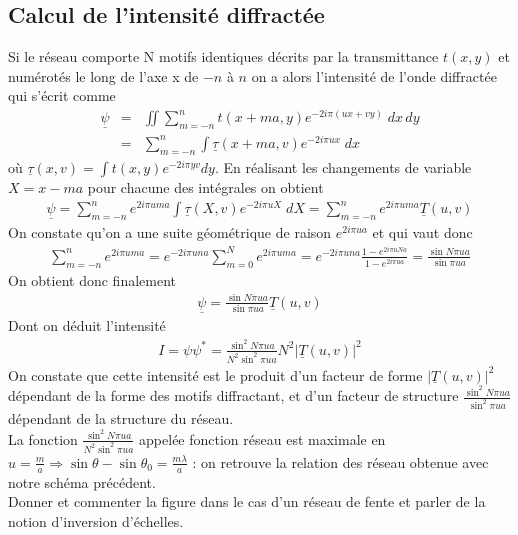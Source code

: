 \documentclass[12pt,prb,aps,epsf]{article}
\begin{document}
\subsection{Calcul de l'intensité diffractée}
Si le réseau comporte N motifs identiques décrits par la transmittance $t(x,y)$ et numérotés le long de l'axe x de $-n$ à $n$ on a alors l'intensité de l'onde diffractée qui s'écrit comme 
\begin{eqnarray}
\underline{\psi} &=& \iint \sum_{m= -n}^{n} t(x+ma, y) e^{-2i\pi(ux+vy)}\; dx\,dy\\
&=& \sum_{m= -n}^{n} \int \underline{\tau}(x+ma, v) e^{-2i\pi ux} \;dx
\end{eqnarray}
où $\underline{\tau}(x, v) = \int t(x,y) e^{-2i\pi yv} dy$. En réalisant les changements de variable $X = x - ma$ pour chacune des intégrales on obtient 
\begin{eqnarray}
\underline{\psi} = \sum_{m= -n}^{n} e^{2i\pi uma}\int \underline{\tau}(X, v) e^{-2i\pi uX} \;dX = \sum_{m= -n}^{n} e^{2i\pi uma} \underline{T}(u,v)
\end{eqnarray}
On constate qu'on a une suite géométrique de raison $e^{2i\pi u a}$ et qui vaut donc 
\begin{eqnarray}
\sum_{m= -n}^{n} e^{2i\pi uma} = e^{-2i\pi una} \sum_{m= 0}^{N} e^{2i\pi uma} = e^{-2i\pi una} \frac{1 - e^{2i\pi uNa}}{1-e^{2i\pi ua}} = \frac{\sin N\pi u a}{\sin \pi u a}
\end{eqnarray}
On obtient donc finalement 
\begin{eqnarray}
\underline{\psi} = \frac{\sin N\pi u a}{\sin \pi u a} \underline{T}(u,v)
\end{eqnarray}
Dont on déduit l'intensité 
\begin{eqnarray}
I = \psi \psi ^* = \frac{\sin^2 N\pi u a}{N^2 \sin^2 \pi u a}N^2|\underline{T}(u,v)|^2
\end{eqnarray}
On constate que cette intensité est le produit d'un facteur de forme $|\underline{T}(u,v)|^2$ dépendant de la forme des motifs diffractant, et d'un facteur de structure $\frac{\sin^2 N\pi u a}{\sin^2 \pi u a}$ dépendant de la structure du réseau. \\
La fonction $\frac{\sin^2 N\pi u a}{N^2 \sin^2 \pi u a}$ appelée fonction réseau est maximale en $u=\frac{m}{a} \Longrightarrow \sin\theta - \sin\theta_0 = \frac{m\lambda}{a}$ : on retrouve la relation des réseau obtenue avec notre schéma précédent.\\

Donner et commenter la figure dans le cas d'un réseau de fente et parler de la notion d'inversion d'échelles.
\end{document}

